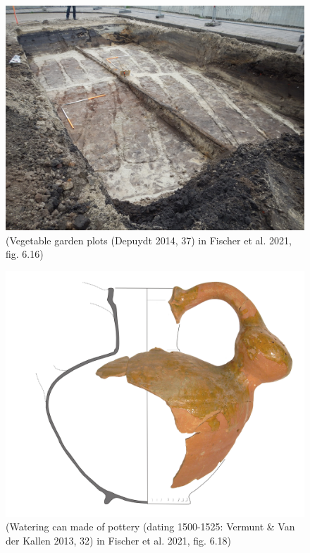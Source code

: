 \documentclass[
  letterpaper,
  DIV=11,
  numbers=noendperiod]{scrartcl}
\begin{document}
\begin{figure}

{\centering \includegraphics{images/Figure_6.16_kuilen.JPG}

}

\caption{(Vegetable garden plots (Depuydt 2014, 37) in Fischer et al.
2021, fig. 6.16)}

\end{figure}

\begin{figure}

{\centering \includegraphics{images/Figure_6.18_gieter.jpg}

}

\caption{(Watering can made of pottery (dating 1500-1525: Vermunt \& Van
der Kallen 2013, 32) in Fischer et al. 2021, fig. 6.18)}

\end{figure}
\end{document}
